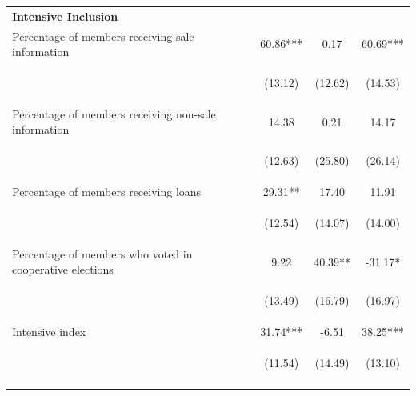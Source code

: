 \documentclass[11pt]{article}
\begin{document}
\begin{table}[H]
{\begin{tabularx}{1.1\linewidth}{lccc}
 
 \textbf{Intensive Inclusion} & & & \\
\noalign{\smallskip}Percentage of members receiving sale information & 60.86*** & 0.17 & 60.69***\\
 & \begin{footnotesize}(13.12)\end{footnotesize} & \begin{footnotesize}(12.62)\end{footnotesize} & \begin{footnotesize}(14.53)\end{footnotesize}\\
\noalign{\smallskip}Percentage of members receiving non-sale information & 14.38 & 0.21 & 14.17\\
 & \begin{footnotesize}(12.63)\end{footnotesize} & \begin{footnotesize}(25.80)\end{footnotesize} & \begin{footnotesize}(26.14)\end{footnotesize}\\
\noalign{\smallskip}Percentage of members receiving loans & 29.31** & 17.40 & 11.91\\
 & \begin{footnotesize}(12.54)\end{footnotesize} & \begin{footnotesize}(14.07)\end{footnotesize} & \begin{footnotesize}(14.00)\end{footnotesize}\\
\noalign{\smallskip}Percentage of members who voted in cooperative elections & 9.22 & 40.39** & -31.17*\\
 & \begin{footnotesize}(13.49)\end{footnotesize} & \begin{footnotesize}(16.79)\end{footnotesize} & \begin{footnotesize}(16.97)\end{footnotesize}\\
\noalign{\smallskip}Intensive index & 31.74*** & -6.51 & 38.25***\\
 & \begin{footnotesize}(11.54)\end{footnotesize} & \begin{footnotesize}(14.49)\end{footnotesize} & \begin{footnotesize}(13.10)\end{footnotesize}\\

 \noalign{\smallskip}\hline
  \end{tabularx}}
\end{table}
\doublespacing
\end{document}
